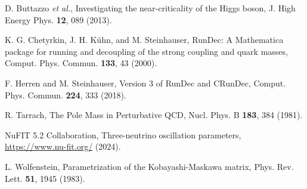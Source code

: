\documentclass[%
amsmath,amssymb,
aps,
prb,
floatfix,
twocolumn
]{revtex4-2}
\begin{document}
\begin{thebibliography}{99}
D. Buttazzo \textit{et al.}, 
Investigating the near-criticality of the Higgs boson, 
J. High Energy Phys. \textbf{12}, 089 (2013).

K. G. Chetyrkin, J. H. Kühn, and M. Steinhauser, 
RunDec: A Mathematica package for running and decoupling of the strong coupling and quark masses, 
Comput. Phys. Commun. \textbf{133}, 43 (2000).

F. Herren and M. Steinhauser, 
Version 3 of RunDec and CRunDec, 
Comput. Phys. Commun. \textbf{224}, 333 (2018).

R. Tarrach, 
The Pole Mass in Perturbative QCD, 
Nucl. Phys. B \textbf{183}, 384 (1981).

NuFIT 5.2 Collaboration, 
Three-neutrino oscillation parameters, 
\url{https://www.nu-fit.org/} (2024).

L. Wolfenstein, 
Parametrization of the Kobayashi-Maskawa matrix, 
Phys. Rev. Lett. \textbf{51}, 1945 (1983).

\end{thebibliography}
\end{document}

